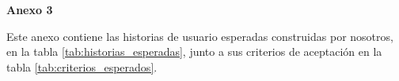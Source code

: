 \documentclass{prgrado}
\begin{document}

\newpage
\vspace{0.75\baselineskip}
{\large\bfseries Anexo 3\par}
\vspace{0.25\baselineskip}

Este anexo contiene las historias de usuario esperadas construidas por nosotros, en la tabla \ref{tab:historias_esperadas}, junto a sus criterios de aceptación en la tabla \ref{tab:criterios_esperados}.
\end{document}
